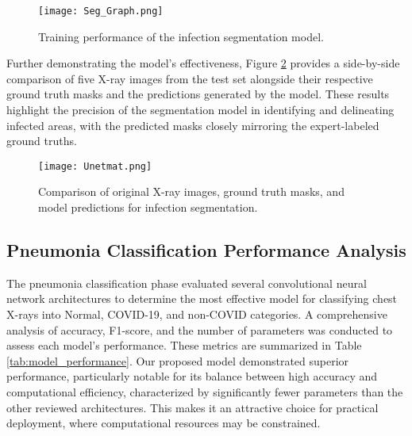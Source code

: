 \documentclass[10pt]{article}
\begin{document}
\begin{figure}[!htbp]
    \centering
    \texttt{[image: Seg\_Graph.png]}
    \caption{Training performance of the infection segmentation model.}
    \label{fig:seg_graph}
\end{figure}


\quad Further demonstrating the model's effectiveness, Figure \ref{fig:xray_comparisons} provides a side-by-side comparison of five X-ray images from the test set alongside their respective ground truth masks and the predictions generated by the model. These results highlight the precision of the segmentation model in identifying and delineating infected areas, with the predicted masks closely mirroring the expert-labeled ground truths.

\begin{figure}[!htbp]
    \centering
    \texttt{[image: Unetmat.png]}
    \caption{Comparison of original X-ray images, ground truth masks, and model predictions for infection segmentation.}
    \label{fig:xray_comparisons}
\end{figure}



\subsection{Pneumonia Classification Performance Analysis}

The pneumonia classification phase evaluated several convolutional neural network architectures to determine the most effective model for classifying chest X-rays into Normal, COVID-19, and non-COVID categories. A comprehensive analysis of accuracy, F1-score, and the number of parameters was conducted to assess each model's performance. These metrics are summarized in Table \ref{tab:model_performance}. Our proposed model demonstrated superior performance, particularly notable for its balance between high accuracy and computational efficiency, characterized by significantly fewer parameters than the other reviewed architectures. This makes it an attractive choice for practical deployment, where computational resources may be constrained.
\end{document}
